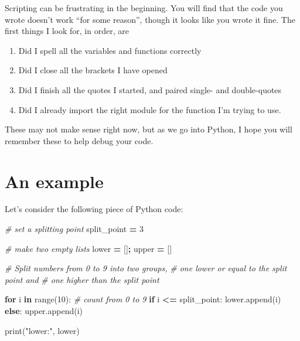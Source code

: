 \documentclass[
  letterpaper,
]{scrbook}
\newenvironment{Shaded}{\begin{snugshade}}{\end{snugshade}}
\newcommand{\BuiltInTok}[1]{#1}
\newcommand{\CommentTok}[1]{\textcolor[rgb]{0.56,0.35,0.01}{\textit{#1}}}
\newcommand{\ControlFlowTok}[1]{\textcolor[rgb]{0.13,0.29,0.53}{\textbf{#1}}}
\newcommand{\DecValTok}[1]{\textcolor[rgb]{0.00,0.00,0.81}{#1}}
\newcommand{\KeywordTok}[1]{\textcolor[rgb]{0.13,0.29,0.53}{\textbf{#1}}}
\newcommand{\NormalTok}[1]{#1}
\newcommand{\OperatorTok}[1]{\textcolor[rgb]{0.81,0.36,0.00}{\textbf{#1}}}
\newcommand{\StringTok}[1]{\textcolor[rgb]{0.31,0.60,0.02}{#1}}
\providecommand{\tightlist}{%
  \setlength{\itemsep}{0pt}\setlength{\parskip}{0pt}}
\begin{document}
Scripting can be frustrating in the beginning. You will find that the code you wrote doesn't work ``for some reason'', though it looks like you wrote it fine. The first things I look for, in order, are

\begin{enumerate}
\def\labelenumi{\arabic{enumi}.}
\tightlist
\item
  Did I spell all the variables and functions correctly
\item
  Did I close all the brackets I have opened
\item
  Did I finish all the quotes I started, and paired single- and double-quotes
\item
  Did I already import the right module for the function I'm trying to use.
\end{enumerate}

These may not make sense right now, but as we go into Python, I hope you will remember these to help debug your code.

\hypertarget{an-example}{%
\section{An example}\label{an-example}}

Let's consider the following piece of Python code:

\begin{Shaded}
\begin{Highlighting}[]
\CommentTok{# set a splitting point}
\NormalTok{split_point }\OperatorTok{=} \DecValTok{3}

\CommentTok{# make two empty lists}
\NormalTok{lower }\OperatorTok{=}\NormalTok{ []}\OperatorTok{;}\NormalTok{ upper }\OperatorTok{=}\NormalTok{ []}

\CommentTok{# Split numbers from 0 to 9 into two groups, }
\CommentTok{# one lower or equal to the split point and }
\CommentTok{# one higher than the split point}

\ControlFlowTok{for}\NormalTok{ i }\KeywordTok{in} \BuiltInTok{range}\NormalTok{(}\DecValTok{10}\NormalTok{):  }\CommentTok{# count from 0 to 9}
    \ControlFlowTok{if}\NormalTok{ i }\OperatorTok{<=}\NormalTok{ split_point:}
\NormalTok{        lower.append(i)}
    \ControlFlowTok{else}\NormalTok{:}
\NormalTok{        upper.append(i)}

\BuiltInTok{print}\NormalTok{(}\StringTok{"lower:"}\NormalTok{, lower)}
\end{Highlighting}
\end{Shaded}
\end{document}
